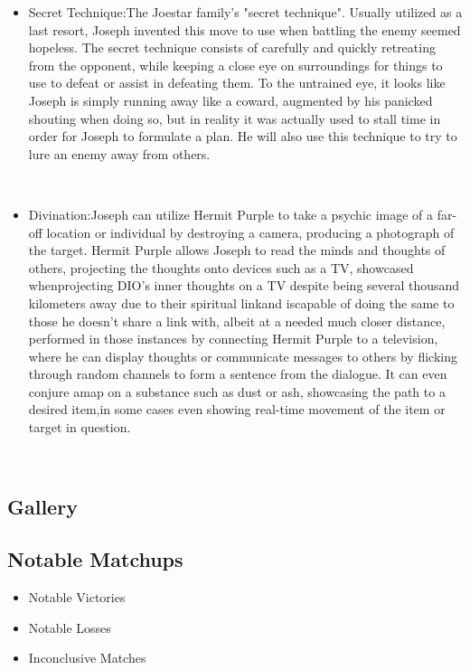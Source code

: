 \documentclass[a4paper,12pt]{article}
\begin{document}
\begin{itemize}
\item Secret Technique:The Joestar family's "secret technique". Usually utilized as a last resort, Joseph invented this move to use when battling the enemy seemed hopeless. The secret technique consists of carefully and quickly retreating from the opponent, while keeping a close eye on surroundings for things to use to defeat or assist in defeating them. To the untrained eye, it looks like Joseph is simply running away like a coward, augmented by his panicked shouting when doing so, but in reality it was actually used to stall time in order for Joseph to formulate a plan. He will also use this technique to try to lure an enemy away from others.
\end{itemize}\\ \par \vspace{0.5cm}

\begin{itemize}
\item Divination:Joseph can utilize Hermit Purple to take a psychic image of a far-off location or individual by destroying a camera, producing a photograph of the target. Hermit Purple allows Joseph to read the minds and thoughts of others, projecting the thoughts onto devices such as a TV, showcased whenprojecting DIO's inner thoughts on a TV despite being several thousand kilometers away due to their spiritual linkand iscapable of doing the same to those he doesn't share a link with, albeit at a needed much closer distance, performed in those instances by connecting Hermit Purple to a television, where he can display thoughts or communicate messages to others by flicking through random channels to form a sentence from the dialogue. It can even conjure amap on a substance such as dust or ash, showcasing the path to a desired item,in some cases even showing real-time movement of the item or target in question.
\end{itemize}\\ \par \vspace{0.5cm}

\subsection*{Gallery}\n\n\subsection*{Notable Matchups}\n\n\begin{itemize}
\item Notable Victories
\item Notable Losses
\item Inconclusive Matches
\end{itemize}\\ \par \vspace{0.5cm}
\end{document}
